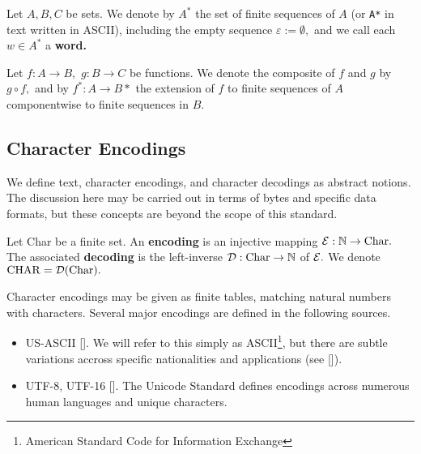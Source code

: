 Let $A, B, C$ be sets. We denote by $A^{*}$ the set of finite sequences of $A$ (or \texttt{A*} in text written in ASCII), including the empty sequence $\varepsilon := \emptyset,$ and we call each $w \in A^{*}$ a \textbf{word.}

Let $f: A \to B,$ $g: B \to C$ be functions. We denote the composite of $f$ and $g$ by $g \circ f,$ and by $f^{*}: A \to B*$ the extension of $f$ to finite sequences of $A$ componentwise to finite sequences in $B.$


\subsection{Character Encodings}
We define text, character encodings, and character decodings as abstract notions. The discussion here may be carried out in terms of bytes and specific data formats, but these concepts are beyond the scope of this standard.

Let Char be a finite set. An \textbf{encoding} is an injective mapping $\mathcal{E} : \mathbb{N} \to \textrm{Char}.$ The associated \textbf{decoding} is the left-inverse $\mathcal{D}: \mathrm{Char} \to \mathbb{N}$ of $\mathcal{E}.$ We denote $\mathrm{CHAR} = \mathcal{D}(\textrm{Char}).$

Character encodings may be given as finite tables, matching natural numbers with characters. Several major encodings are defined in the following sources.
\begin{itemize}
	\item US-ASCII []. We will refer to this simply as ASCII\footnote{American Standard Code for Information Exchange}, but there are subtle variations accross specific nationalities and applications (see []).
	\item UTF-8, UTF-16 []. The Unicode Standard defines encodings across numerous human languages and unique characters.  %
\end{itemize}



